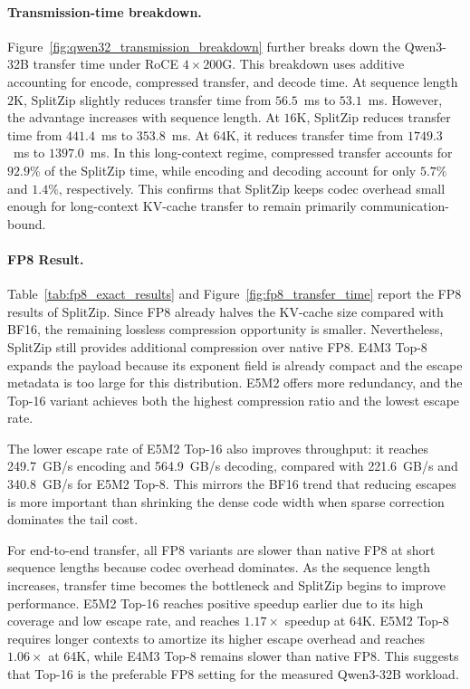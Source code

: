     \paragraph{Transmission-time breakdown.}
    Figure~\ref{fig:qwen32_transmission_breakdown} further breaks down the Qwen3-32B transfer time under RoCE $4\times200$G.
    This breakdown uses additive accounting for encode, compressed transfer, and decode time.
    At sequence length $2$K, SplitZip slightly reduces transfer time from $56.5$~ms to $53.1$~ms.
    However, the advantage increases with sequence length.
    At $16$K, SplitZip reduces transfer time from $441.4$~ms to $353.8$~ms.
    At $64$K, it reduces transfer time from $1749.3$~ms to $1397.0$~ms.
    In this long-context regime, compressed transfer accounts for $92.9\%$ of the SplitZip time, while encoding and decoding account for only $5.7\%$ and $1.4\%$, respectively.
    This confirms that SplitZip keeps codec overhead small enough for long-context KV-cache transfer to remain primarily communication-bound.

    \paragraph{FP8 Result.}
    

    Table~\ref{tab:fp8_exact_results} and Figure~\ref{fig:fp8_transfer_time} report the FP8 results of SplitZip.
    Since FP8 already halves the KV-cache size compared with BF16, the remaining lossless compression opportunity is smaller.
    Nevertheless, SplitZip still provides additional compression over native FP8.
    E4M3 Top-8 expands the payload because its exponent field is already compact and the escape metadata is too large for this distribution.
    E5M2 offers more redundancy, and the Top-16 variant achieves both the highest compression ratio and the lowest escape rate.
    
    The lower escape rate of E5M2 Top-16 also improves throughput: it reaches 249.7~GB/s encoding and 564.9~GB/s decoding, compared with 221.6~GB/s and 340.8~GB/s for E5M2 Top-8.
    This mirrors the BF16 trend that reducing escapes is more important than shrinking the dense code width when sparse correction dominates the tail cost.
    
    For end-to-end transfer, all FP8 variants are slower than native FP8 at short sequence lengths because codec overhead dominates.
    As the sequence length increases, transfer time becomes the bottleneck and SplitZip begins to improve performance.
    E5M2 Top-16 reaches positive speedup earlier due to its high coverage and low escape rate, and reaches $1.17\times$ speedup at 64K.
    E5M2 Top-8 requires longer contexts to amortize its higher escape overhead and reaches $1.06\times$ at 64K, while E4M3 Top-8 remains slower than native FP8.
    This suggests that Top-16 is the preferable FP8 setting for the measured Qwen3-32B workload.


